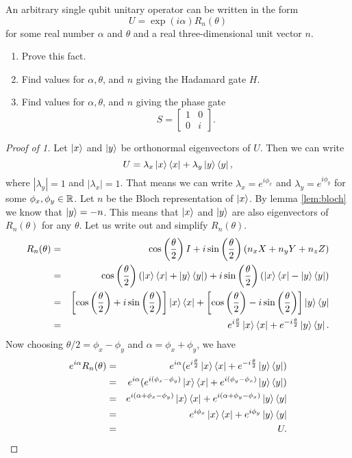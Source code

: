 \documentclass{article}
\begin{document}
\begin{exercise}
  An arbitrary single qubit unitary operator can be written in the form
  \[U=\exp(i\alpha)R_n(\theta)\]
  for some real number $\alpha$ and $\theta$ and a real three-dimensional unit vector $n$.
  \begin{enumerate}
    \item Prove this fact.
    \item Find values for $\alpha,\theta$, and $n$ giving the Hadamard gate $H$.
    \item Find values for $\alpha,\theta$, and $n$ giving the phase gate
    \[S=\begin{bmatrix}
      1&0\\
      0&i
    \end{bmatrix}.\]
  \end{enumerate}
  \begin{proof}[Proof of 1]
    Let $\ket{x}$ and $\ket{y}$ be orthonormal eigenvectors of $U$. Then we can write
    \[U=\lambda_x\ket{x}\bra{x}+\lambda_y\ket{y}\bra{y},\]
    where $|\lambda_y|=1$ and $|\lambda_x|=1$. That means we can write $\lambda_x=e^{i\phi_x}$ and $\lambda_y=e^{i\phi_y}$ for some $\phi_x,\phi_y\in\mathbb{R}$. Let $n$ be the Bloch representation of $\ket{x}$. By lemma \ref{lem:bloch} we know that $\ket{y}=-n$. This means that $\ket{x}$ and $\ket{y}$ are also eigenvectors of $R_n(\theta)$ for any $\theta$. Let us write out and simplify $R_n(\theta)$.
    \begin{eqnarray*}
      R_n(\theta)&=&\cos\left(\frac{\theta}{2}\right)I+i\sin\left(\frac{\theta}{2}\right)(n_xX+n_yY+n_zZ) \\
      &=& \cos\left(\frac{\theta}{2}\right)(\ket{x}\bra{x}+\ket{y}\bra{y})+i\sin\left(\frac{\theta}{2}\right)(\ket{x}\bra{x}-\ket{y}\bra{y}) \\
      &=& \left[\cos\left(\frac{\theta}{2}\right)
      +i\sin\left(\frac{\theta}{2}\right)\right]\ket{x}\bra{x}+\left[\cos\left(\frac{\theta}{2}\right)
      -i\sin\left(\frac{\theta}{2}\right)\right]\ket{y}\bra{y} \\
      &=&e^{i\frac{\theta}{2}}\ket{x}\bra{x}+e^{-i\frac{\theta}{2}}\ket{y}\bra{y}.
    \end{eqnarray*}
    Now choosing $\theta/2=\phi_x-\phi_y$ and $\alpha=\phi_x+\phi_y$, we have
    \begin{eqnarray*}
      e^{i\alpha}R_n(\theta)
      &=&e^{i\alpha}(e^{i\frac{\theta}{2}}\ket{x}\bra{x}+e^{-i\frac{\theta}{2}}\ket{y}\bra{y}) \\
      &=&e^{i\alpha}(e^{i(\phi_x-\phi_y)}\ket{x}\bra{x}+e^{i(\phi_y-\phi_x)}\ket{y}\bra{y}) \\
      &=& e^{i(\alpha+\phi_x-\phi_y)}\ket{x}\bra{x}+e^{i(\alpha+\phi_y-\phi_x)}\ket{y}\bra{y} \\
      &=& e^{i\phi_x}\ket{x}\bra{x}+e^{i\phi_y}\ket{y}\bra{y} \\
      &=& U.
    \end{eqnarray*}
  \end{proof}
\end{exercise}

\begin{theorem}

\end{theorem}
\end{document}
